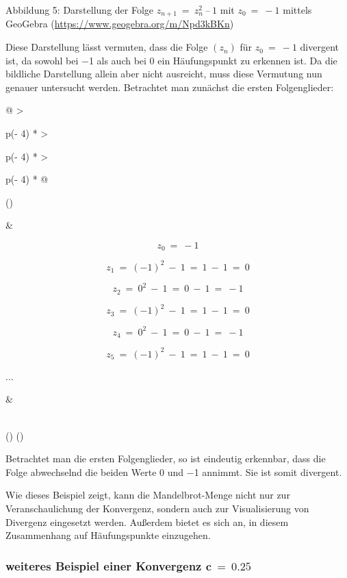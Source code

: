 \documentclass[a4paper, 12pt]{book}
\begin{document}
\protect\hypertarget{_Toc167901655}{}{}Abbildung 5: Darstellung der
Folge \(z_{n + 1}\  = \ z_{n}^{2}\ –\ 1\) mit \(z_{0}\  = \  - 1\)
mittels GeoGebra (\url{https://www.geogebra.org/m/Npd3kBKn})

Diese Darstellung lässt vermuten, dass die Folge
\(\left( z_{n} \right)\) für \(z_{0}\  = \  - 1\) divergent ist, da
sowohl bei \(-\)1 als auch bei 0 ein Häufungspunkt zu erkennen ist. Da
die bildliche Darstellung allein aber nicht ausreicht, muss diese
Vermutung nun genauer untersucht werden. Betrachtet man zunächst die
ersten Folgenglieder:

\begin{longtable}[]{@{}
  >{\raggedright\arraybackslash}p{(\columnwidth - 4\tabcolsep) * }
  >{\raggedright\arraybackslash}p{(\columnwidth - 4\tabcolsep) * }
  >{\raggedright\arraybackslash}p{(\columnwidth - 4\tabcolsep) * }@{}}
\toprule()
\begin{minipage}[b]{\linewidth}\raggedright
\end{minipage} & \begin{minipage}[b]{\linewidth}\raggedright
\[z_{0}\  = \  - 1\]

\[z_{1}\  = \ ( - 1)^{2}\  - \ 1\  = \ 1\  - \ 1\  = \ 0\]

\[z_{2}\  = \ 0^{2}\  - \ 1\  = \ 0\  - \ 1\  = \  - 1\]

\[z_{3}\  = \ ( - 1)^{2}\  - \ 1\  = \ 1\  - \ 1\  = \ 0\]

\[z_{4}\  = \ 0^{2}\  - \ 1\  = \ 0\  - \ 1\  = \  - 1\]

\[z_{5}\  = \ ( - 1)^{2}\  - \ 1\  = \ 1\  - \ 1\  = \ 0\]

...
\end{minipage} & \begin{minipage}[b]{\linewidth}\raggedright
\end{minipage} \\
\midrule()
\endhead
\bottomrule()
\end{longtable}

Betrachtet man die ersten Folgenglieder, so ist eindeutig erkennbar,
dass die Folge abwechselnd die beiden Werte 0 und \(-\)1 annimmt. Sie
ist somit divergent.

Wie dieses Beispiel zeigt, kann die Mandelbrot-Menge nicht nur zur
Veranschaulichung der Konvergenz, sondern auch zur Visualisierung von
Divergenz eingesetzt werden. Außerdem bietet es sich an, in diesem
Zusammenhang auf Häufungspunkte einzugehen.

\hypertarget{weiteres-beispiel-einer-konvergenz-mathbfc-0.25}{%
\subsubsection{\texorpdfstring{weiteres Beispiel einer Konvergenz
\(\mathbf{c\  = \ 0.25}\)}{weiteres Beispiel einer Konvergenz \textbackslash mathbf\{c\textbackslash{}  = \textbackslash{} 0.25\}}}\label{weiteres-beispiel-einer-konvergenz-mathbfc-0.25}}
\end{document}
